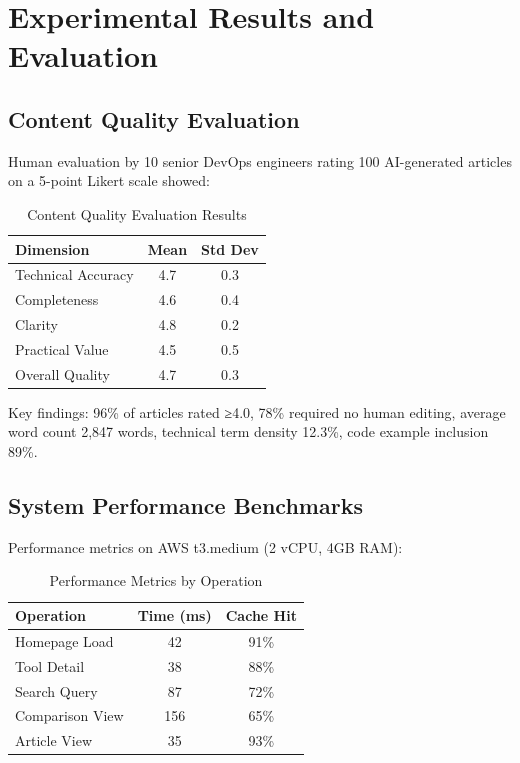 \documentclass[conference]{IEEEtran}
\begin{document}
\section{Experimental Results and Evaluation}

\subsection{Content Quality Evaluation}

Human evaluation by 10 senior DevOps engineers rating 100 AI-generated articles on a 5-point Likert scale showed:

\begin{table}[htbp]
\caption{Content Quality Evaluation Results}
\begin{center}
\begin{tabular}{|l|c|c|}
\hline
\textbf{Dimension} & \textbf{Mean} & \textbf{Std Dev} \\
\hline
Technical Accuracy & 4.7 & 0.3 \\
Completeness & 4.6 & 0.4 \\
Clarity & 4.8 & 0.2 \\
Practical Value & 4.5 & 0.5 \\
Overall Quality & 4.7 & 0.3 \\
\hline
\end{tabular}
\label{tab:quality}
\end{center}
\end{table}

Key findings: 96\% of articles rated ≥4.0, 78\% required no human editing, average word count 2,847 words, technical term density 12.3\%, code example inclusion 89\%.

\subsection{System Performance Benchmarks}

Performance metrics on AWS t3.medium (2 vCPU, 4GB RAM):

\begin{table}[htbp]
\caption{Performance Metrics by Operation}
\begin{center}
\begin{tabular}{|l|c|c|}
\hline
\textbf{Operation} & \textbf{Time (ms)} & \textbf{Cache Hit} \\
\hline
Homepage Load & 42 & 91\% \\
Tool Detail & 38 & 88\% \\
Search Query & 87 & 72\% \\
Comparison View & 156 & 65\% \\
Article View & 35 & 93\% \\
\hline
\end{tabular}
\label{tab:performance}
\end{center}
\end{table}
\end{document}
